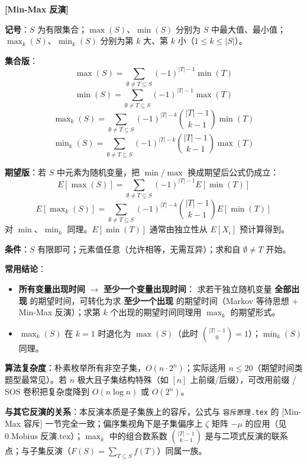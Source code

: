 \textbf{[Min-Max 反演]}

\textbf{记号}：$S$ 为有限集合；$\max(S)$、$\min(S)$ 分别为 $S$ 中最大值、最小值；$\max_k(S)$、$\min_k(S)$ 分别为第 $k$ 大、第 $k$ 小（$1\le k\le |S|$）。

\textbf{集合版}：
\[
\max(S) = \sum_{\emptyset \neq T \subseteq S} (-1)^{|T|-1} \min(T)
\]
\[
\min(S) = \sum_{\emptyset \neq T \subseteq S} (-1)^{|T|-1} \max(T)
\]
\[
\max\nolimits_k(S) = \sum_{\emptyset \neq T \subseteq S} (-1)^{|T|-k} \binom{|T|-1}{k-1} \min(T)
\]
\[
\min\nolimits_k(S) = \sum_{\emptyset \neq T \subseteq S} (-1)^{|T|-k} \binom{|T|-1}{k-1} \max(T)
\]

\textbf{期望版}：若 $S$ 中元素为随机变量，把 $\min / \max$ 换成期望后公式仍成立：
\[
E[\max(S)] = \sum_{\emptyset \neq T \subseteq S} (-1)^{|T|-1} E[\min(T)]
\]
\[
E[\max\nolimits_k(S)] = \sum_{\emptyset \neq T \subseteq S} (-1)^{|T|-k} \binom{|T|-1}{k-1} E[\min(T)]
\]
对 $\min$、$\min_k$ 同理。$E[\min(T)]$ 通常由独立性从 $E[X_i]$ 预计算得到。

\textbf{条件}：$S$ 有限即可；元素值任意（允许相等，无需互异）；求和自 $\emptyset \neq T$ 开始。

\textbf{常用结论}：
\begin{itemize}
\item \textbf{所有变量出现时间} $\to$ \textbf{至少一个变量出现时间}：
  求若干独立随机变量 \textbf{全部出现} 的期望时间，可转化为求 \textbf{至少一个出现} 的期望时间（Markov 等待思想 + Min-Max 反演）；求第 $k$ 个出现的期望时间同理用 $\max_k$ 的期望形式。
\item $\max_k(S)$ 在 $k=1$ 时退化为 $\max(S)$（此时 $\binom{|T|-1}{0}=1$）；$\min_k(S)$ 同理。
\end{itemize}

\textbf{算法复杂度}：朴素枚举所有非空子集，$O(n \cdot 2^n)$；实际适用 $n \le 20$（期望时间类题型最常见）。若 $n$ 极大且子集结构特殊（如 $[n]$ 上前缀/后缀），可改用前缀 / SOS 卷积把复杂度降到 $O(n \log n)$ 或 $O(2^n)$。

\textbf{与其它反演的关系}：本反演本质是子集族上的容斥，公式与 \texttt{容斥原理.tex} 的 [Min-Max 容斥] 一节完全一致；偏序集视角下是子集偏序上 $\zeta$ 矩阵 $-\mu$ 的应用（见 $0.\text{Mobius 反演.tex}$）；$\max_k$ 中的组合数系数 $\binom{|T|-1}{k-1}$ 是与二项式反演的联系点；与子集反演（$F(S)=\sum_{T\subseteq S}f(T)$）同属一族。

